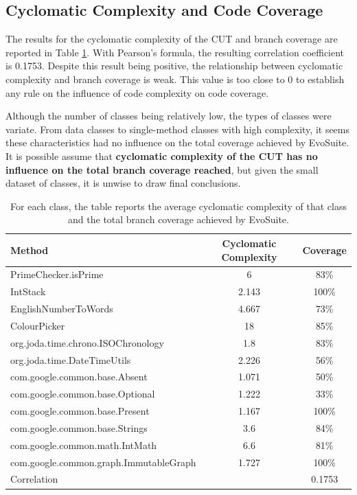 \subsection{Cyclomatic Complexity and Code Coverage}

The results for the cyclomatic complexity of the CUT and branch coverage are reported in Table \ref{cyccov}.
With Pearson's formula, the resulting correlation coefficient is 0.1753. 
Despite this result being positive, the relationship between cyclomatic complexity and branch coverage is weak.
This value is too close to 0 to establish any rule on the influence of code complexity on code coverage. 

Although the number of classes being relatively low, the types of classes were variate. 
From data classes to single-method classes with high complexity, it seems these characteristics had no influence on the total coverage achieved by EvoSuite.
It is possible assume that \textbf{cyclomatic complexity of the CUT has no influence on the total branch coverage reached}, but given the small dataset of classes, it is unwise to draw final conclusions. 

{\setlength{\extrarowheight}{1ex}
\begin{table}[tbp]
\begin{center}
\begin{tabular}{ m{6cm} c c }
\hline 
Method & Cyclomatic Complexity & Coverage \\ [0.5ex]
\hline
PrimeChecker.isPrime & 6 & 83\% \\ [0.5ex] 
IntStack & 2.143 & 100\%  \\ [0.5ex]
EnglishNumberToWords & 4.667 & 73\%  \\ [0.5ex]
ColourPicker & 18 & 85\% \\ [0.5ex]
org.joda.time.chrono.ISOChronology & 1.8 & 83\%  \\ [0.5ex]
org.joda.time.DateTimeUtils & 2.226 & 56\% \\ [0.5ex]
com.google.common.base.Absent & 1.071 & 50\%\\ [0.5ex]
com.google.common.base.Optional & 1.222 & 33\% \\ [0.5ex]
com.google.common.base.Present & 1.167 & 100\% \\ [0.5ex]
com.google.common.base.Strings & 3.6 & 84\% \\ [0.5ex]
com.google.common.math.IntMath & 6.6 & 81\% \\ [0.5ex]
com.google.common.graph.ImmutableGraph & 1.727 & 100\% \\ [0.5ex]
\hline
\multicolumn{2}{m{6cm}}{Correlation} & 0.1753 \\ [0.5ex]
\hline
\end{tabular}
\end{center}
\caption{For each class, the table reports the average cyclomatic complexity of that class and the total branch coverage achieved by EvoSuite.}
\label{cyccov}
\end{table}
}

